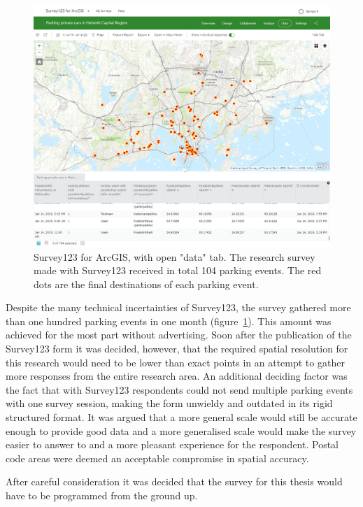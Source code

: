 \begin{figure}[H]%
    \includegraphics[width=\textwidth]{images/survey123_dataview.png}
    \caption[Survey123 data tab]{Survey123 for ArcGIS, with open "data" tab. The research survey made with Survey123 received in total 104 parking events. The red dots are the final destinations of each parking event.}%
    \label{fig:survey123_dataview}%
\end{figure}

Despite the many technical incertainties of Survey123, the survey gathered more than one hundred parking events in one month (figure~\ref{fig:survey123_dataview}). This amount was achieved for the most part without advertising. Soon after the publication of the Survey123 form it was decided, however, that the required spatial resolution for this research would need to be lower than exact points in an attempt to gather more responses from the entire research area. An additional deciding factor was the fact that with Survey123 respondents could not send multiple parking events with one survey session, making the form unwieldy and outdated in its rigid structured format. It was argued that a more general scale would still be accurate enough to provide good data and a more generalised scale would make the survey easier to answer to and a more pleasant experience for the respondent. Postal code areas were deemed an acceptable compromise in spatial accuracy.

After careful consideration it was decided that the survey for this thesis would have to be programmed from the ground up.

